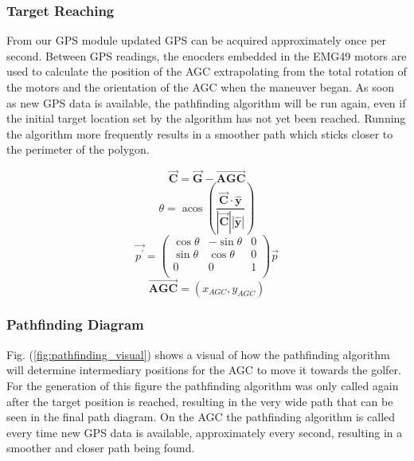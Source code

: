 \documentclass[11pt,landscape]{article}
\begin{document}
\begin{multicols}{3}
\subsubsection{Target Reaching}
From our GPS module updated GPS can be acquired approximately once per
second. Between GPS readings, the enocders embedded in the EMG49 motors are used
to calculate the position of the AGC extrapolating from the total rotation of
the motors and the orientation of the AGC when the maneuver began. As soon as
new GPS data is available, the pathfinding algorithm will be run again, even if
the initial target location set by the algorithm has not yet been reached.
Running the algorithm more frequently results in a smoother path which sticks
closer to the perimeter of the polygon.

\begin{equation}
        \overrightarrow{\mathbf{C}} = \overrightarrow{\mathbf{G}} - \overrightarrow{\mathbf{AGC}}
    \label{eq:chord}
\end{equation}
\hspace{0.5cm}
\begin{equation}
        \theta=\operatorname{acos}\left(\frac{\overrightarrow{\mathbf{C}} \cdot \hat{\mathbf{y}}}{|\overrightarrow{\mathbf{C}}| |\hat{\mathbf{y}}|}\right)
    \label{eq:theta}
\end{equation}
\hspace{1cm}
\begin{equation}
    \overrightarrow{p^\prime} = \left(\begin{matrix}
        \operatorname{cos}\theta & -\operatorname{sin}\theta & 0 \\
        \operatorname{sin}\theta & \operatorname{cos}\theta & 0 \\
        0 & 0& 1\\
    \end{matrix}\right) \overrightarrow{p}
    \label{eq:rotation_mat}
\end{equation}
\hspace{0.5cm}
\begin{equation*}
    \overrightarrow{\mathbf{AGC}} = (x_{AGC}, y_{AGC})
\end{equation*}

\subsubsection{Pathfinding Diagram}
Fig. (\ref{fig:pathfinding_visual}) shows a visual of how the pathfinding
algorithm will determine intermediary positions for the AGC to move it towards
the golfer. For the generation of this figure the pathfinding algorithm was only
called again after the target position is reached, resulting in the very wide
path that can be seen in the final path diagram. On the AGC the pathfinding
algorithm is called every time new GPS data is available, approximately every
second, resulting in a smoother and closer path being found.
\end{multicols}
\end{document}
